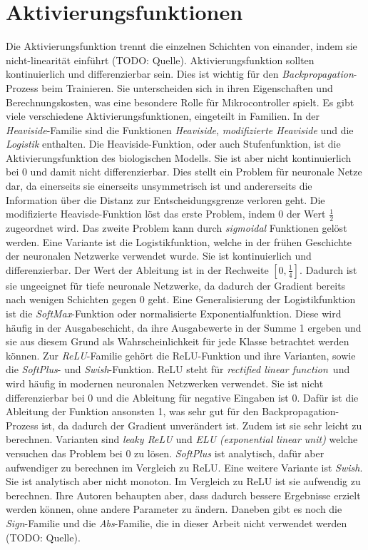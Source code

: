 \section{Aktivierungsfunktionen}
Die Aktivierungsfunktion trennt die einzelnen Schichten von einander, indem sie nicht-linearität einführt (TODO: Quelle).
Aktivierungsfunktion sollten kontinuierlich und differenzierbar sein.
Dies ist wichtig für den \textit{Backpropagation}-Prozess beim Trainieren.
Sie unterscheiden sich in ihren Eigenschaften und Berechnungskosten, was eine besondere Rolle für Mikrocontroller spielt.
Es gibt viele verschiedene Aktivierungsfunktionen, eingeteilt in Familien.
\newline
\newline
In der \textit{Heaviside}-Familie sind die Funktionen \textit{Heaviside}, \textit{modifizierte Heaviside} und die \textit{Logistik} enthalten.
Die Heaviside-Funktion, oder auch Stufenfunktion, ist die Aktivierungsfunktion des biologischen Modells.
Sie ist aber nicht kontinuierlich bei 0 und damit nicht differenzierbar.
Dies stellt ein Problem für neuronale Netze dar, da einerseits sie einerseits unsymmetrisch ist und andererseits die Information über die Distanz zur Entscheidungsgrenze verloren geht.
Die modifizierte Heavisde-Funktion löst das erste Problem, indem 0 der Wert $\frac{1}{2}$ zugeordnet wird.
Das zweite Problem kann durch \textit{sigmoidal} Funktionen gelöst werden.
Eine Variante ist die Logistikfunktion, welche in der frühen Geschichte der neuronalen Netzwerke verwendet wurde.
Sie ist kontinuierlich und differenzierbar. Der Wert der Ableitung ist in der Rechweite $[0, \frac{1}{4}]$.
Dadurch ist sie ungeeignet für tiefe neuronale Netzwerke, da dadurch der Gradient bereits nach wenigen Schichten gegen 0 geht.
Eine Generalisierung der Logistikfunktion ist die \textit{SoftMax}-Funktion oder normalisierte Exponentialfunktion.
Diese wird häufig in der Ausgabeschicht, da ihre Ausgabewerte in der Summe 1 ergeben und sie aus diesem Grund als Wahrscheinlichkeit für jede Klasse betrachtet werden können.
\newline
\newline
Zur \textit{ReLU}-Familie gehört die ReLU-Funktion und ihre Varianten, sowie die \textit{SoftPlus}- und \textit{Swish}-Funktion.
ReLU steht für \glqq\textit{rectified linear function}\grqq\ und wird häufig in modernen neuronalen Netzwerken verwendet.
Sie ist nicht differenzierbar bei 0 und die Ableitung für negative Eingaben ist 0.
Dafür ist die Ableitung der Funktion ansonsten 1, was sehr gut für den Backpropagation-Prozess ist, da dadurch der Gradient unverändert ist.
Zudem ist sie sehr leicht zu berechnen.
Varianten sind \textit{leaky ReLU} und \textit{ELU (exponential linear unit)} welche versuchen das Problem bei 0 zu lösen.
\textit{SoftPlus} ist analytisch, dafür aber aufwendiger zu berechnen im Vergleich zu ReLU.
Eine weitere Variante ist \textit{Swish}. Sie ist analytisch aber nicht monoton.
Im Vergleich zu ReLU ist sie aufwendig zu berechnen.
Ihre Autoren behaupten aber, dass dadurch bessere Ergebnisse erzielt werden können, ohne andere Parameter zu ändern.
\newline
\newline
Daneben gibt es noch die \textit{Sign}-Familie und die \textit{Abs}-Familie, die in dieser Arbeit nicht verwendet werden (TODO: Quelle).
